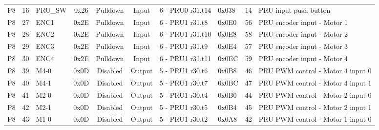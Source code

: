 \documentclass[a4paper,11pt]{article}
\begin{document}
\begin{tabular}{llllllllll}
\multicolumn{1}{c}{P8} & \multicolumn{1}{c}{16} & PRU\_SW & \multicolumn{1}{c}{0x26} & \multicolumn{1}{c}{Pulldown} & \multicolumn{1}{c}{Input} & 6 - PRU0 r31.t14 & 0x038 & \multicolumn{1}{r}{14} & PRU input push button \\ 
\multicolumn{1}{c}{P8} & \multicolumn{1}{c}{27} & ENC1 & \multicolumn{1}{c}{0x2E} & \multicolumn{1}{c}{Pulldown} & \multicolumn{1}{c}{Input} & 6 - PRU1 r31.t8 & 0x0E0 & \multicolumn{1}{r}{56} & PRU encoder input - Motor 1 \\ 
\multicolumn{1}{c}{P8} & \multicolumn{1}{c}{28} & ENC2 & \multicolumn{1}{c}{0x2E} & \multicolumn{1}{c}{Pulldown} & \multicolumn{1}{c}{Input} & 6 - PRU1 r31.t10 & 0x0E8 & \multicolumn{1}{r}{58} & PRU encoder input - Motor 2 \\ 
\multicolumn{1}{c}{P8} & \multicolumn{1}{c}{29} & ENC3 & \multicolumn{1}{c}{0x2E} & \multicolumn{1}{c}{Pulldown} & \multicolumn{1}{c}{Input} & 6 - PRU1 r31.t9 & 0x0E4 & \multicolumn{1}{r}{57} & PRU encoder input - Motor 3 \\ 
\multicolumn{1}{c}{P8} & \multicolumn{1}{c}{30} & ENC4 & \multicolumn{1}{c}{0x2E} & \multicolumn{1}{c}{Pulldown} & \multicolumn{1}{c}{Input} & 6 - PRU1 r31.t11 & 0x0EC & \multicolumn{1}{r}{59} & PRU encoder input - Motor 4 \\ 
\multicolumn{1}{c}{P8} & \multicolumn{1}{c}{39} & M4-0 & \multicolumn{1}{c}{0x0D} & \multicolumn{1}{c}{Disabled} & \multicolumn{1}{c}{Output} & 5 - PRU1 r30.t6 & 0x0B8 & \multicolumn{1}{r}{46} & PRU PWM control - Motor 4 input 0 \\ 
\multicolumn{1}{c}{P8} & \multicolumn{1}{c}{40} & M4-1 & \multicolumn{1}{c}{0x0D} & \multicolumn{1}{c}{Disabled} & \multicolumn{1}{c}{Output} & 5 - PRU1 r30.t7 & 0x0BC & \multicolumn{1}{r}{47} & PRU PWM control - Motor 4 input 1 \\ 
\multicolumn{1}{c}{P8} & \multicolumn{1}{c}{41} & M2-0 & \multicolumn{1}{c}{0x0D} & \multicolumn{1}{c}{Disabled} & \multicolumn{1}{c}{Output} & 5 - PRU1 r30.t4 & 0x0B0 & \multicolumn{1}{r}{44} & PRU PWM control - Motor 2 input 0 \\ 
\multicolumn{1}{c}{P8} & \multicolumn{1}{c}{42} & M2-1 & \multicolumn{1}{c}{0x0D} & \multicolumn{1}{c}{Disabled} & \multicolumn{1}{c}{Output} & 5 - PRU1 r30.t5 & 0x0B4 & \multicolumn{1}{r}{45} & PRU PWM control - Motor 2 input 1 \\ 
\multicolumn{1}{c}{P8} & \multicolumn{1}{c}{43} & M1-0 & \multicolumn{1}{c}{0x0D} & \multicolumn{1}{c}{Disabled} & \multicolumn{1}{c}{Output} & 5 - PRU1 r30.t2 & 0x0A8 & \multicolumn{1}{r}{42} & PRU PWM control - Motor 1 input 0  \\ 

\end{tabular}
\end{document}
